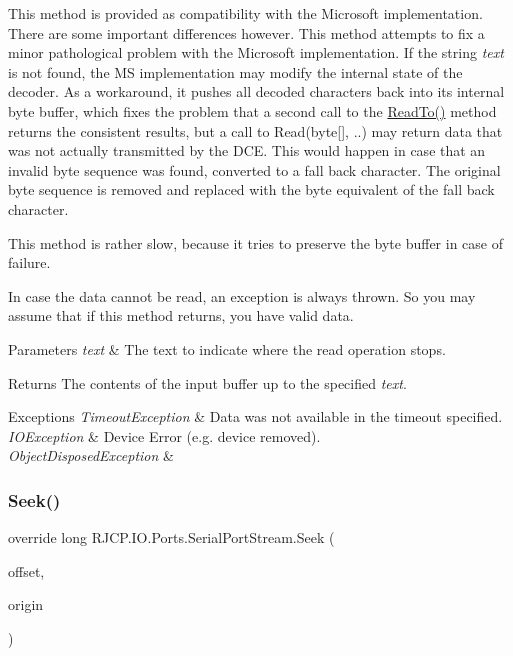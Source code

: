 This method is provided as compatibility with the Microsoft implementation. There are some important differences however. This method attempts to fix a minor pathological problem with the Microsoft implementation. If the string {\itshape text} is not found, the MS implementation may modify the internal state of the decoder. As a workaround, it pushes all decoded characters back into its internal byte buffer, which fixes the problem that a second call to the \mbox{\hyperlink{class_r_j_c_p_1_1_i_o_1_1_ports_1_1_serial_port_stream_a083926914c8855489f5bdcbd0bc3a78c}{Read\+To()}} method returns the consistent results, but a call to Read(byte\mbox{[}\mbox{]}, ..) may return data that was not actually transmitted by the D\+CE. This would happen in case that an invalid byte sequence was found, converted to a fall back character. The original byte sequence is removed and replaced with the byte equivalent of the fall back character.

This method is rather slow, because it tries to preserve the byte buffer in case of failure.

In case the data cannot be read, an exception is always thrown. So you may assume that if this method returns, you have valid data.


\begin{DoxyParams}{Parameters}
{\em text} & The text to indicate where the read operation stops.\\
\hline
\end{DoxyParams}
\begin{DoxyReturn}{Returns}
The contents of the input buffer up to the specified {\itshape text}.
\end{DoxyReturn}

\begin{DoxyExceptions}{Exceptions}
{\em Timeout\+Exception} & Data was not available in the timeout specified.\\
\hline
{\em I\+O\+Exception} & Device Error (e.\+g. device removed).\\
\hline
{\em Object\+Disposed\+Exception} & \\
\hline
\end{DoxyExceptions}
\mbox{\label{class_r_j_c_p_1_1_i_o_1_1_ports_1_1_serial_port_stream_a2b38eca4d69c1e37cec7aa3628a2ce3f}} 
\subsubsection{\texorpdfstring{Seek()}{Seek()}}
{\footnotesize\ttfamily override long R\+J\+C\+P.\+I\+O.\+Ports.\+Serial\+Port\+Stream.\+Seek (\begin{DoxyParamCaption}\item[{long}]{offset,  }\item[{Seek\+Origin}]{origin }\end{DoxyParamCaption})}




